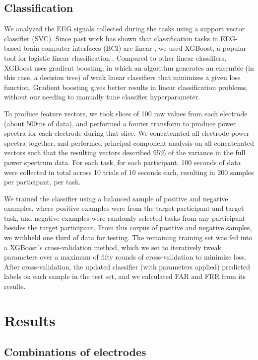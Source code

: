 \documentclass{sigchi}
\begin{document}
\subsection{Classification}

We analyzed the EEG signals collected during the tasks using a support vector classifier (SVC). Since past work has shown that classification tasks in EEG-based brain-computer interfaces (BCI) are linear \cite{Garrett2003a}, we used XGBoost, a popular tool for logistic linear classification \cite{Chen2016}. Compared to other linear classifiers, XGBoost uses gradient boosting; in which an algorithm generates an ensemble (in this case, a decision tree) of weak linear classifiers that minimizes a given loss function. Gradient boosting gives better results in linear classification problems, without our needing to manually tune classifier hyperparameter.

To produce feature vectors, we took slices of 100 raw values from each electrode (about 500ms of data), and performed a fourier transform to produce power spectra for each electrode during that slice. We concatenated all electrode power spectra together, and performed principal component analysis on all concatenated vectors such that the resulting vectors described 95\% of the variance in the full power spectrum data. For each task, for each participant, 100 seconds of data were collected in total across 10 trials of 10 seconds each, resulting in 200 samples per participant, per task.

We trained the classifier using a balanced sample of positive and negative examples, where positive examples were from the target participant and target task, and negative examples were randomly selected tasks from any participant besides the target participant. From this corpus of positive and negative samples, we withheld one third of data for testing. The remaining training set was fed into a XGBoost's cross-validation method, which we set to iteratively tweak parameters over a maximum of fifty rounds of cross-validation to minimize loss. After cross-validation, the updated classifier (with parameters applied) predicted labels on each sample in the test set, and we calculated FAR and FRR from its results.

\section{Results}
\subsection{Combinations of electrodes}
\end{document}
